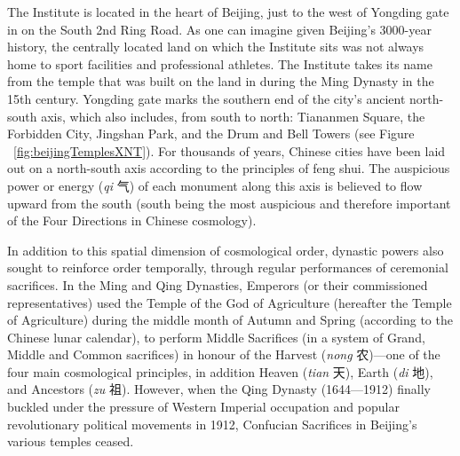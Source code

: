 \begin{CJK}{UTF8}{gbsn}
The Institute is located in the heart of Beijing, just to the west of Yongding gate in on the South 2nd Ring Road. As one can imagine given Beijing's 3000-year history, the centrally located land on which the Institute sits was not always home to sport facilities and professional athletes.  The Institute takes its name from the temple that was built on the land in during the Ming Dynasty in the 15th century.  Yongding gate marks the southern end of the city's ancient north-south axis, which also includes, from south to north: Tiananmen Square, the Forbidden City, Jingshan Park, and the Drum and Bell Towers (see Figure ~\ref{fig:beijingTemplesXNT}).  For thousands of years, Chinese cities have been laid out on a north-south axis according to the principles of feng shui. The auspicious power or energy (\textit{qi} 气) of each monument along this axis is believed to flow upward from the south (south being the most auspicious and therefore important of the Four Directions in Chinese cosmology).

In addition to this spatial dimension of cosmological order, dynastic powers also sought to reinforce order temporally, through regular performances of ceremonial sacrifices.  In the Ming and Qing Dynasties, Emperors (or their commissioned representatives) used the Temple of the God of Agriculture (hereafter the Temple of Agriculture) during the middle month of Autumn and Spring (according to the Chinese lunar calendar), to perform Middle Sacrifices (in a system of Grand, Middle and Common sacrifices) in honour of the Harvest (\textit{nong} 农)---one of the four main cosmological principles, in addition Heaven (\textit{tian} 天), Earth (\textit{di} 地), and Ancestors (\textit{zu} 祖)\citep[98]{Brownell2008}.  However, when the Qing Dynasty (1644---1912) finally buckled under the pressure of Western Imperial occupation and popular revolutionary political movements in 1912, Confucian Sacrifices in Beijing's various temples ceased.


\end{CJK}
